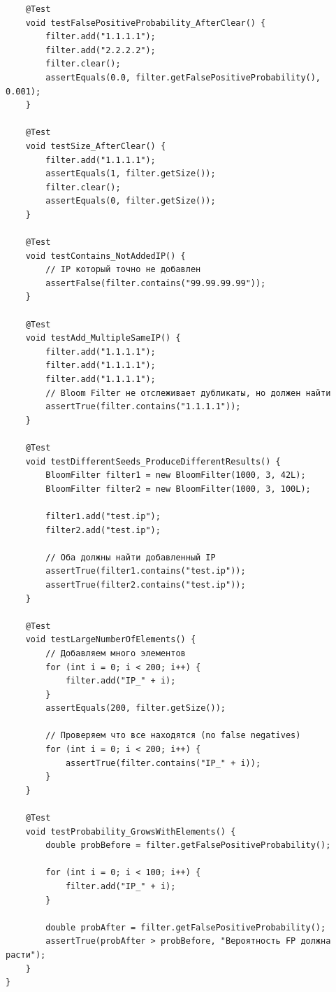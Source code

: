 \begin{verbatim}
    @Test
    void testFalsePositiveProbability_AfterClear() {
        filter.add("1.1.1.1");
        filter.add("2.2.2.2");
        filter.clear();
        assertEquals(0.0, filter.getFalsePositiveProbability(), 0.001);
    }

    @Test
    void testSize_AfterClear() {
        filter.add("1.1.1.1");
        assertEquals(1, filter.getSize());
        filter.clear();
        assertEquals(0, filter.getSize());
    }

    @Test
    void testContains_NotAddedIP() {
        // IP который точно не добавлен
        assertFalse(filter.contains("99.99.99.99"));
    }

    @Test
    void testAdd_MultipleSameIP() {
        filter.add("1.1.1.1");
        filter.add("1.1.1.1");
        filter.add("1.1.1.1");
        // Bloom Filter не отслеживает дубликаты, но должен найти
        assertTrue(filter.contains("1.1.1.1"));
    }

    @Test
    void testDifferentSeeds_ProduceDifferentResults() {
        BloomFilter filter1 = new BloomFilter(1000, 3, 42L);
        BloomFilter filter2 = new BloomFilter(1000, 3, 100L);

        filter1.add("test.ip");
        filter2.add("test.ip");

        // Оба должны найти добавленный IP
        assertTrue(filter1.contains("test.ip"));
        assertTrue(filter2.contains("test.ip"));
    }

    @Test
    void testLargeNumberOfElements() {
        // Добавляем много элементов
        for (int i = 0; i < 200; i++) {
            filter.add("IP_" + i);
        }
        assertEquals(200, filter.getSize());

        // Проверяем что все находятся (no false negatives)
        for (int i = 0; i < 200; i++) {
            assertTrue(filter.contains("IP_" + i));
        }
    }

    @Test
    void testProbability_GrowsWithElements() {
        double probBefore = filter.getFalsePositiveProbability();

        for (int i = 0; i < 100; i++) {
            filter.add("IP_" + i);
        }

        double probAfter = filter.getFalsePositiveProbability();
        assertTrue(probAfter > probBefore, "Вероятность FP должна расти");
    }
}
\end{verbatim}


